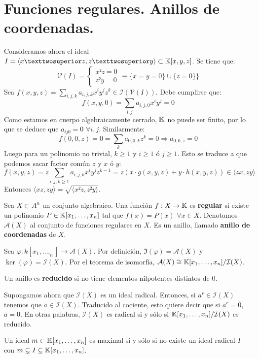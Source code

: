 \documentclass[ACGA.tex]{subfiles}
\begin{document}
\section{Funciones regulares. Anillos de coordenadas.}
Consideramos ahora el ideal $I = \langle x²z,z²y\rangle \subset \K[x,y,z]$. Se tiene que:
\[ \mathcal{V}(I) = \begin{cases}
	x²z = 0\\
	z²y = 0
\end{cases} \equiv \{x=y=0\}\cup\{ z=0\} \}\]
Sea $f(x,y,z) = \sum_{i,j,k}a_{i,j,k}x^iy^jz^k \in \mathcal{I}(\mathcal{V}(I))$. Debe cumplirse que:
\[ f(x,y,0) = \sum_{i,j}a_{i,j,0}x^iy^j = 0 \]
Como estamos en cuerpo algebraicamente cerrado, $\mathbb{K}$ no puede ser finito, por lo que se deduce que $a_{ij0}=0$ $\forall i,j$.
Similarmente:
\[ f(0,0,z) = 0 = \sum_{k}a_{0,0,k}z^k = 0 \Rightarrow a_{0,0,z} = 0 \]
Luego para un polinomio no trivial, $k ≥ 1$ y $i ≥ 1$ ó $j ≥ 1$. Esto se traduce a que podemos sacar factor común $z$ y $x$ ó $y$:
\[ f(x,y,z) = z \sum_{i,j,k ≥ 1} a_{i,j,k} x^iy^jz^{k-1} = z(x\cdot g(x,y,z)+y\cdot h(x,y,z)) \in \langle zx,zy \rangle \]
Entonces $\langle xz,zy\rangle = \sqrt{\langle x²z,z²y\rangle}$.


\begin{defi} Sea $X \subset A^n$ un conjunto algebraico.
Una función $f : X \to \mathbb{K}$ es \textbf{regular} si existe un polinomio 
$P \in \mathbb{K}[x_1,\dots,x_n]$ tal que $f(x) = P(x)$ $\forall x \in X$.
Denotamos $\mathcal{A}(X)$ al conjunto de funciones regulares en $X$. Es un anillo, llamado \textbf{anillo de coordenadas} de $X$.
\end{defi}

Sea $φ : k[x_1,\dots,_n] \to \mathcal{A}(X)$. Por definición, $\Im(φ) = \mathcal{A}(X)$ y $\ker(φ) = \mathcal{I}(X)$. Por el teorema de isomorfía, $\mathcal{A}(X) \cong \mathbb{K}[x_1,\dots,x_n]/\mathcal{I}(X)$.

\begin{defi}\label{definicion}
Un anillo es \textbf{reducido} si no tiene elementos nilpotentes distintos de $0$.
\end{defi}
Supongamos ahora que $\mathcal{I}(X)$ es un ideal radical. Entonces, si $a^r\in\mathcal{I}(X)$ tenemos que $a\in\mathcal{I}(X)$. Traducido al cociente, esto quiere decir que si $\overline{a}^r = \overline{0}$, $\overline{a}=0$. En otras palabras, $\mathcal{I}(X)$ es radical si y sólo si $\mathbb{K}[x_1,\dots,x_n]/\mathcal{I}(X)$ es reducido.

\begin{lemma}
Un ideal $m \subset \mathbb{K}[x_1,\dots,x_n]$ es maximal si y sólo si no existe un ideal radical $I$ con $m \subsetneq I \subsetneq \mathbb{K}[x_1,\dots,x_n]$.
\end{lemma}
\end{document}
